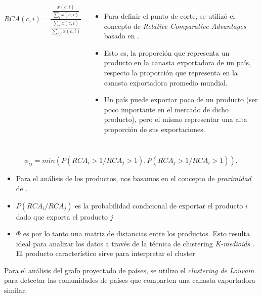 \documentclass[compress]{beamer}
\begin{document}
\begin{frame}

\begin{columns}[c] 
	
	$$
	RCA(c,i)= \frac{\displaystyle \frac{x(c,i)}{\displaystyle \sum_{i}x(c,i)}}{\frac{\displaystyle\sum_{c}x(c,i)}{\displaystyle \sum_{c,i}x(c,i)}}
	$$	
	\small
	
	\begin{itemize}[label=\faRebel]
		\item Para definir el punto de corte, se utilizó el concepto de \textit{Relative Comparative Advantages} basado en 	\cite{Hidalgo2009}.
		\item Esto es, la proporción que representa un producto en la canasta exportadora de un país, respecto la proporción que representa en la canasta exportadora promedio mundial.
		\item Un país puede exportar poco de un producto (ser poco importante en el mercado de dicho producto), pero el mismo representar una alta proporción de sus exportaciones.
	\end{itemize}
	
\end{columns}

\end{frame}


\begin{frame}

$$
\phi_{ij} = min (P(RCA_i>1/RCA_j>1),P(RCA_j>1/RCA_i>1)),
$$
	\small
	
\begin{itemize}[label=\faRebel]
	\item Para el análisis de los productos, nos basamos en el concepto de \textit{proximidad} de \cite{Hidalgo2009}.
	\item $P(RCA_i/RCA_j)$ es la probabilidad condicional de exportar el producto $i$ dado que exporta el producto $j$
	\item $\Phi$ es por lo tanto una matriz de distancias entre los productos. Esto resulta ideal para analizar los datos a través de la técnica de clustering \textit{K-medioids} \citep{kaufman1987clustering}. El producto característico sirve para interpretar el cluster
\end{itemize}
	
\end{frame}

\begin{frame}
	Para el análisis del grafo proyectado de países, se utilizo el \textit{clustering de Louvain} \citep{blondel2008fast} para detectar las comunidades de países que comparten una canasta exportadora similar.
\end{frame}
\end{document}
